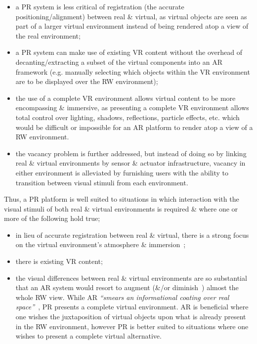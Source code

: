 \begin{itemize}
	\item a PR system is less critical of registration (the accurate positioning/alignment) between real \& virtual, as virtual objects are seen as part of a larger virtual environment instead of being rendered atop a view of the real environment;
	\item a PR system can make use of existing VR content without the overhead of decanting/extracting a subset of the virtual components into an AR framework (e.g. manually selecting which objects within the VR environment are to be displayed over the RW environment);
	\item the use of a complete VR environment allows virtual content to be more encompassing \& immersive, as presenting a complete VR environment allows total control over lighting, shadows, reflections, particle effects, etc. which would be difficult or impossible for an AR platform to render atop a view of a RW environment.
	\item the vacancy problem is further addressed, but instead of doing so by linking real \& virtual environments by sensor \& actuator infrastructure, vacancy in either environment is alleviated by furnishing users with the ability to transition between visual stimuli from each environment.
\end{itemize}

Thus, a PR platform is well suited to situations in which interaction with the visual stimuli of both real \& virtual environments is required \& where one or more of the following hold true;

\begin{itemize}
	\item in lieu of accurate registration between real \& virtual, there is a strong focus on the virtual environment's atmosphere \& immersion~\cite{deamicis:gamebased};
	\item there is existing VR content;
	\item the visual differences between real \& virtual environments are so substantial that an AR system would resort to augment (\&/or diminish~\cite{Mann2002}) almost the whole RW view. While AR \textit{``smears an informational coating over real space''}~\cite{Andersen}, PR presents a complete virtual environment. AR is beneficial where one wishes the juxtaposition of virtual objects upon what is already present in the RW environment, however PR is better suited to situations where one wishes to present a complete virtual alternative.
\end{itemize}

